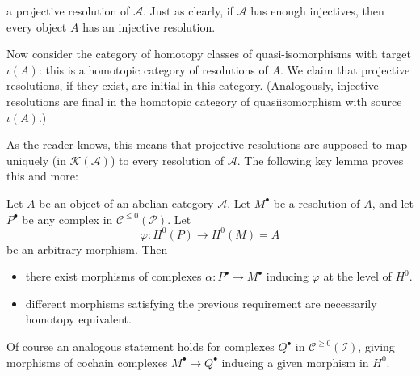 a projective resolution of $\mathcal{A}$. Just as clearly, if $\mathcal{A}$ has enough injectives, then every object $A$ has an injective resolution.\par
Now consider the category of homotopy classes of quasi-isomorphisms with target $\iota(A)$: this is a homotopic category of resolutions of $A$. We claim that projective resolutions, if they exist, are initial in this category. (Analogously, injective resolutions are final in the homotopic category of quasiisomorphism with source $\iota(A)$.)\par
As the reader knows, this means that projective resolutions are supposed to map uniquely (in $\mathcal{K}(\mathcal{A})$) to every resolution of $\mathcal{A}$. The following key lemma proves
this and more:
\begin{lemma}\label{pro reso initial}
Let $A$ be an object of an abelian category $\mathcal{A}$. Let $M^\bullet$ be a resolution of $A$, and let $P^\bullet$ be any complex in $\mathcal{C}^{\leq0}(\mathcal{P})$. Let
\[\varphi:H^0(P)\to H^0(M)=A\]
be an arbitrary morphism. Then
\begin{itemize}
\item there exist morphisms of complexes $\alpha:P^\bullet\to M^\bullet$ inducing $\varphi$ at the level of $H^0$.
\item different morphisms satisfying the previous requirement are necessarily homotopy equivalent.
\end{itemize}
\end{lemma}
Of course an analogous statement holds for complexes $Q^\bullet$ in $\mathcal{C}^{\geq0}(\mathcal{I})$, giving morphisms of cochain complexes $M^\bullet\to Q^\bullet$ inducing a given morphism in $H^0$.
